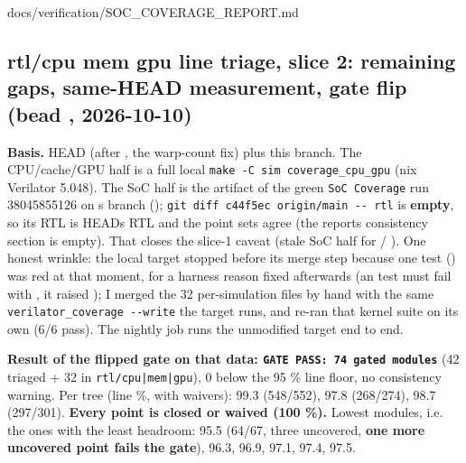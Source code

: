\begin{relocated}{docs/verification/SOC_COVERAGE_REPORT.md}
\subsection{\texorpdfstring{rtl/cpu \textbar{} mem \textbar{} gpu line
triage, slice 2: remaining gaps, same-HEAD measurement, gate flip (bead
,
2026-10-10)}{rtl/cpu \textbar{} mem \textbar{} gpu line triage, slice 2: remaining gaps, same-HEAD measurement, gate flip (bead , 2026-10-10)}}\label{tm:flow:soc-coverage-report:rtlcpu-mem-gpu-line-triage-slice-2-remaining-gaps-same-head-measurement-gate-flip-bead-a5ze-2026-10-10}

\textbf{Basis.} HEAD  (after , the 
warp-count fix) plus this branch. The
CPU/\allowbreak{}cache/\allowbreak{}GPU half is a full local
\texttt{make\ -\allowbreak{}C\ sim\ coverage\_\allowbreak{}cpu\_\allowbreak{}gpu}
(nix Verilator 5.048). The SoC half is the  artifact
of the green \texttt{SoC\ Coverage} run 38045855126 on \textquotesingle s branch ();
\texttt{git\ diff\ c44f5ec\ origin/\allowbreak{}main\ -\allowbreak{}-\allowbreak{}\ rtl}
is \textbf{empty}, so its RTL is HEAD\textquotesingle s RTL and the
point sets agree (the report\textquotesingle s consistency section is
empty). That closes the slice-1 caveat (stale SoC half for  /
). One honest wrinkle: the local
 target stopped before its merge step because one
test () was red at that
moment, for a harness reason fixed afterwards (an 
test must fail with , it raised
); I merged the 32 per-simulation  files
by hand with the same
\texttt{verilator\_\allowbreak{}coverage\ -\allowbreak{}-\allowbreak{}write}
the target runs, and re-ran that kernel suite on its own (6/6 pass). The
nightly job runs the unmodified target end to end.

\textbf{Result of the flipped gate on that data:
\texttt{GATE\ PASS:\allowbreak{}\ 74\ gated\ modules}} (42 triaged + 32
in \texttt{rtl/\allowbreak{}cpu|mem|gpu}), 0 below the 95 \% line floor,
no consistency warning. Per tree (line \%, with waivers): 
99.3 (548/\allowbreak{}552),  97.8 (268/\allowbreak{}274),
 98.7 (297/\allowbreak{}301). \textbf{Every 
point is closed or waived (100 \%).} Lowest modules, i.e. the ones with
the least headroom:  95.5 (64/67, three
uncovered, \textbf{one more uncovered point fails the gate}),
 96.3,  96.9,
 97.1,  97.4,
 97.5.


\end{relocated}
